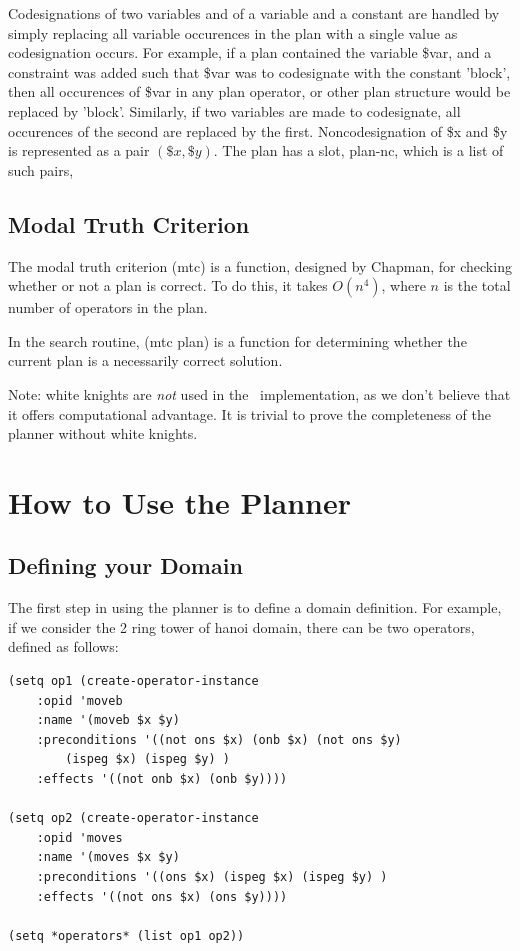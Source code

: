 Codesignations of two variables and of a variable and a constant 
are handled by simply replacing all variable occurences
in the plan with a single value as codesignation occurs.  For example,
if a plan contained the variable \$var, and a constraint was added
such that \$var was to codesignate with the constant 'block', then all
occurences of
\$var in any plan operator, or other plan structure would be replaced by
'block'.  Similarly, if two variables are made to codesignate, all
occurences of the second are replaced by the first.  Noncodesignation
of \$x and \$y is represented as a pair $(\$x, \$y)$.  The plan has a
slot, plan-nc, which is a list of such pairs,

\subsection{Modal Truth Criterion}
The modal truth criterion (mtc) is a function, designed by Chapman, for
checking whether or not a plan  is correct.  To do this, it takes
$O(n^4)$, where $n$ is the total number of operators in the plan.

In the search routine, (mtc plan) is a function for determining whether the
current plan is a necessarily correct solution.

Note:  white knights are {\em not} used in the \tweak\ implementation,
as we don't believe that it offers computational advantage.  It is
trivial to prove the completeness of the planner without white knights.

\section{How to Use the Planner}

\subsection{Defining your Domain}

The first step in using the planner is to define a domain definition.
For example, if we consider the 2 ring tower of hanoi domain, there
can be two operators, defined as follows:

\begin{verbatim}
(setq op1 (create-operator-instance 
	:opid 'moveb 	 
	:name '(moveb $x $y) 	 
	:preconditions '((not ons $x) (onb $x) (not ons $y) 
		(ispeg $x) (ispeg $y) ) 	 
	:effects '((not onb $x) (onb $y))))

(setq op2 (create-operator-instance 	 
	:opid 'moves 	 
	:name '(moves $x $y) 	 
	:preconditions '((ons $x) (ispeg $x) (ispeg $y) )
	:effects '((not ons $x) (ons $y))))

(setq *operators* (list op1 op2))
\end{verbatim}

